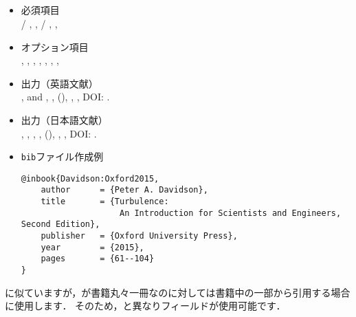 \documentclass[a4paper,fleqn,uplatex,dvipdfmx]{jsarticle}
\begin{document}
\subsection{\ttinbook}
\label{ssec:inbook}
\begin{tcolorbox}[enhanced, title=\ttinbook, drop fuzzy shadow]
    \begin{itemize}
        \item 必須項目 \\
        \ttauthor / \tteditor, \tttitle, \ttchapter / \ttpages, \ttpublisher, \ttyear
        \item オプション項目 \\
        \ttvolume, \ttseries, \ttaddress, \ttedition, \ttmonth, \ttnote, \ttkey, \ttdoi
        \item 出力（英語文献） \\
            \colorbox[gray]{0.8}{\ttauthorf}, \colorbox[gray]{0.8}{\ttauthors} and \colorbox[gray]{0.8}{\ttauthort}, \colorbox[gray]{0.8}{\tttitle}, \colorbox[gray]{0.8}{\ttpublisher} (\colorbox[gray]{0.8}{\ttyear}), \colorbox[gray]{0.8}{\ttpages}, \colorbox[gray]{0.8}{\ttnote}, DOI: \colorbox[gray]{0.8}{\ttdoi}.
        \item 出力（日本語文献） \\
            \colorbox[gray]{0.8}{\ttauthorf}, \colorbox[gray]{0.8}{\ttauthors}, \colorbox[gray]{0.8}{\ttauthort}, \colorbox[gray]{0.8}{\tttitle}, \colorbox[gray]{0.8}{\ttpublisher} (\colorbox[gray]{0.8}{\ttyear}), \colorbox[gray]{0.8}{\ttpages}, \colorbox[gray]{0.8}{\ttnote}, DOI: \colorbox[gray]{0.8}{\ttdoi}.
        \item \verb|bib|ファイル作成例 \vspace{-3mm}
\begin{verbatim}
@inbook{Davidson:Oxford2015,
    author      = {Peter A. Davidson},
    title       = {Turbulence: 
                    An Introduction for Scientists and Engineers, Second Edition},
    publisher   = {Oxford University Press},
    year        = {2015},
    pages       = {61--104}
}
\end{verbatim}
    \end{itemize}
\end{tcolorbox}

\ttbook に似ていますが，\ttbook が書籍丸々一冊なのに対して\ttinbook は書籍中の一部から引用する場合に使用します．
そのため，\ttbook と異なり\ttpages フィールドが使用可能です．
\end{document}
